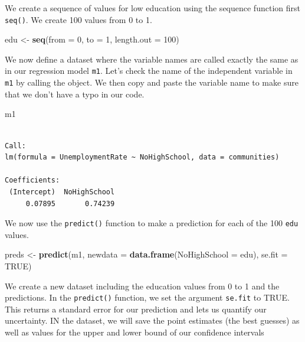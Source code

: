 \documentclass[]{article}
\newenvironment{Shaded}{\begin{snugshade}}{\end{snugshade}}
\newcommand{\DataTypeTok}[1]{\textcolor[rgb]{0.13,0.29,0.53}{#1}}
\newcommand{\DecValTok}[1]{\textcolor[rgb]{0.00,0.00,0.81}{#1}}
\newcommand{\KeywordTok}[1]{\textcolor[rgb]{0.13,0.29,0.53}{\textbf{#1}}}
\newcommand{\NormalTok}[1]{#1}
\newcommand{\OtherTok}[1]{\textcolor[rgb]{0.56,0.35,0.01}{#1}}
\newcommand{\StringTok}[1]{\textcolor[rgb]{0.31,0.60,0.02}{#1}}
\begin{document}
We create a sequence of values for low education using the sequence function first \texttt{seq()}. We create 100 values from 0 to 1.

\begin{Shaded}
\begin{Highlighting}[]
\NormalTok{edu <-}\StringTok{ }\KeywordTok{seq}\NormalTok{(}\DataTypeTok{from =} \DecValTok{0}\NormalTok{, }\DataTypeTok{to =} \DecValTok{1}\NormalTok{, }\DataTypeTok{length.out =} \DecValTok{100}\NormalTok{)}
\end{Highlighting}
\end{Shaded}

We now define a dataset where the variable names are called exactly the same as in our regression model \texttt{m1}. Let's check the name of the independent variable in \texttt{m1} by calling the object. We then copy and paste the variable name to make sure that we don't have a typo in our code.

\begin{Shaded}
\begin{Highlighting}[]
\NormalTok{m1}
\end{Highlighting}
\end{Shaded}

\begin{verbatim}

Call:
lm(formula = UnemploymentRate ~ NoHighSchool, data = communities)

Coefficients:
 (Intercept)  NoHighSchool  
     0.07895       0.74239  
\end{verbatim}

We now use the \texttt{predict()} function to make a prediction for each of the 100 \texttt{edu} values.

\begin{Shaded}
\begin{Highlighting}[]
\NormalTok{preds <-}\StringTok{ }\KeywordTok{predict}\NormalTok{(m1, }\DataTypeTok{newdata =} \KeywordTok{data.frame}\NormalTok{(}\DataTypeTok{NoHighSchool =}\NormalTok{ edu), }\DataTypeTok{se.fit =} \OtherTok{TRUE}\NormalTok{)}
\end{Highlighting}
\end{Shaded}

We create a new dataset including the education values from 0 to 1 and the predictions. In the \texttt{predict()} function, we set the argument \texttt{se.fit} to TRUE. This returns a standard error for our prediction and lets us quantify our uncertainty. IN the dataset, we will save the point estimates (the best guesses) as well as values for the upper and lower bound of our confidence intervals
\end{document}
